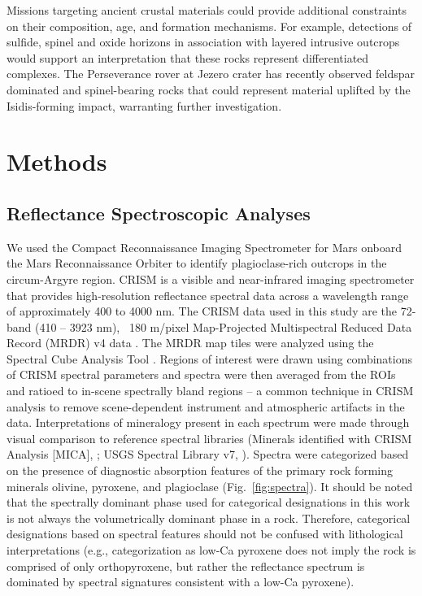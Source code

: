 \documentclass[12pt]{article}
\begin{document}
Missions targeting ancient crustal materials could provide additional constraints on their composition, age, and formation mechanisms. For example, detections of sulfide, spinel and oxide horizons in association with layered intrusive outcrops would support an interpretation that these rocks represent differentiated complexes. The Perseverance rover at Jezero crater has recently observed feldspar dominated \citep{Bedford2024, Schmidt2025} and spinel-bearing rocks \citep{Mansbach2024, Bedford2024, Lawson2025} that could represent material uplifted by the Isidis-forming impact, warranting further investigation.

\section*{Methods}

\subsection*{Reflectance Spectroscopic Analyses}
We used the Compact Reconnaissance Imaging Spectrometer for Mars \citep[CRISM;][]{Murchie2007} onboard the Mars Reconnaissance Orbiter to identify plagioclase-rich outcrops in the circum-Argyre region. CRISM is a visible and near-infrared imaging spectrometer that provides high-resolution reflectance spectral data across a wavelength range of approximately 400 to 4000 nm. The CRISM data used in this study are the 72-band (410 – 3923 nm), ~180 m/pixel Map-Projected Multispectral Reduced Data Record (MRDR) v4 data \citep{Seelos2023,Murchie2024}. The MRDR map tiles were analyzed using the Spectral Cube Analysis Tool \citep{Phillips2024}. Regions of interest were drawn using combinations of CRISM spectral parameters \citep{Viviano2014} and spectra were then averaged from the ROIs and ratioed to in-scene spectrally bland regions -- a common technique in CRISM analysis to remove scene-dependent instrument and atmospheric artifacts in the data. Interpretations of mineralogy present in each spectrum were made through visual comparison to reference spectral libraries (Minerals identified with CRISM Analysis [MICA], \citealt{Viviano2014}; USGS Spectral Library v7, \citealt{Kokaly2017}). Spectra were categorized based on the presence of diagnostic absorption features of the primary rock forming minerals olivine, pyroxene, and plagioclase (Fig.~\ref{fig:spectra}). It should be noted that the spectrally dominant phase used for categorical designations in this work is not always the volumetrically dominant phase in a rock. Therefore, categorical designations based on spectral features should not be confused with lithological interpretations (e.g., categorization as low-Ca pyroxene does not imply the rock is comprised of only orthopyroxene, but rather the reflectance spectrum is dominated by spectral signatures consistent with a low-Ca pyroxene).
\end{document}
